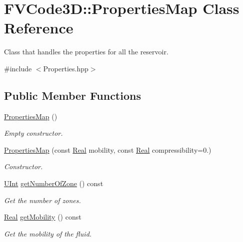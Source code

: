 \hypertarget{classFVCode3D_1_1PropertiesMap}{}\section{F\+V\+Code3D\+:\+:Properties\+Map Class Reference}
\label{classFVCode3D_1_1PropertiesMap}


Class that handles the properties for all the reservoir.  




{\ttfamily \#include $<$Properties.\+hpp$>$}

\subsection*{Public Member Functions}
\begin{DoxyCompactItemize}
\item 
\hyperlink{classFVCode3D_1_1PropertiesMap_a8cf38425cb5139944861f9dd739990c6}{Properties\+Map} ()
\begin{DoxyCompactList}\small\item\em Empty constructor. \end{DoxyCompactList}\item 
\hyperlink{classFVCode3D_1_1PropertiesMap_a9867cdd12c945b69b55327a850339754}{Properties\+Map} (const \hyperlink{namespaceFVCode3D_a40c1f5588a248569d80aa5f867080e83}{Real} mobility, const \hyperlink{namespaceFVCode3D_a40c1f5588a248569d80aa5f867080e83}{Real} compressibility=0.)
\begin{DoxyCompactList}\small\item\em Constructor. \end{DoxyCompactList}\item 
\hyperlink{namespaceFVCode3D_a4bf7e328c75d0fd504050d040ebe9eda}{U\+Int} \hyperlink{classFVCode3D_1_1PropertiesMap_a69ce6f83b7fcd50b27aea1a2e3e87ba1}{get\+Number\+Of\+Zone} () const 
\begin{DoxyCompactList}\small\item\em Get the number of zones. \end{DoxyCompactList}\item 
\hyperlink{namespaceFVCode3D_a40c1f5588a248569d80aa5f867080e83}{Real} \hyperlink{classFVCode3D_1_1PropertiesMap_a810ea62ca881e4db57acd601bcea23cf}{get\+Mobility} () const 
\begin{DoxyCompactList}\small\item\em Get the mobility of the fluid. \end{DoxyCompactList}\item 

\end{DoxyCompactItemize}
